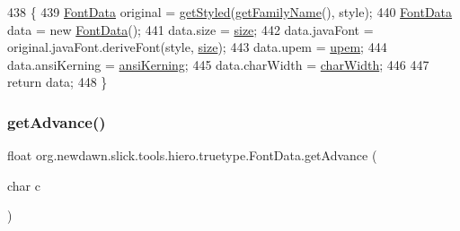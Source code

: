 \begin{DoxyCode}
438                                                       \{
439         \mbox{\hyperlink{classorg_1_1newdawn_1_1slick_1_1tools_1_1hiero_1_1truetype_1_1_font_data_a749bc5408e8c04106d580a31b5c9e597}{FontData}} original = \mbox{\hyperlink{classorg_1_1newdawn_1_1slick_1_1tools_1_1hiero_1_1truetype_1_1_font_data_a06cde06f668d43b61523d65ae1d74055}{getStyled}}(\mbox{\hyperlink{classorg_1_1newdawn_1_1slick_1_1tools_1_1hiero_1_1truetype_1_1_font_data_a4c170863a370f609118f9acbc8d598a7}{getFamilyName}}(), style);
440         \mbox{\hyperlink{classorg_1_1newdawn_1_1slick_1_1tools_1_1hiero_1_1truetype_1_1_font_data_a749bc5408e8c04106d580a31b5c9e597}{FontData}} data = \textcolor{keyword}{new} \mbox{\hyperlink{classorg_1_1newdawn_1_1slick_1_1tools_1_1hiero_1_1truetype_1_1_font_data_a749bc5408e8c04106d580a31b5c9e597}{FontData}}();
441         data.size = \mbox{\hyperlink{classorg_1_1newdawn_1_1slick_1_1tools_1_1hiero_1_1truetype_1_1_font_data_a96af538e2a7368fdba46ffc2ad6a9a0e}{size}};
442         data.javaFont = original.javaFont.deriveFont(style, \mbox{\hyperlink{classorg_1_1newdawn_1_1slick_1_1tools_1_1hiero_1_1truetype_1_1_font_data_a96af538e2a7368fdba46ffc2ad6a9a0e}{size}});
443         data.upem = \mbox{\hyperlink{classorg_1_1newdawn_1_1slick_1_1tools_1_1hiero_1_1truetype_1_1_font_data_ab589aa26cfcd58d7e7f8ffa3c68800a5}{upem}};
444         data.ansiKerning = \mbox{\hyperlink{classorg_1_1newdawn_1_1slick_1_1tools_1_1hiero_1_1truetype_1_1_font_data_ab28272a83e0e9aa3836fbc5f7d913801}{ansiKerning}};
445         data.charWidth = \mbox{\hyperlink{classorg_1_1newdawn_1_1slick_1_1tools_1_1hiero_1_1truetype_1_1_font_data_a2080ecdf80e54bb38848255c70b43706}{charWidth}};
446         
447         \textcolor{keywordflow}{return} data;
448     \}
\end{DoxyCode}
\mbox{\label{classorg_1_1newdawn_1_1slick_1_1tools_1_1hiero_1_1truetype_1_1_font_data_ad2145125927d20f203f0d66f68c366cf}} 
\subsubsection{\texorpdfstring{get\+Advance()}{getAdvance()}}
{\footnotesize\ttfamily float org.\+newdawn.\+slick.\+tools.\+hiero.\+truetype.\+Font\+Data.\+get\+Advance (\begin{DoxyParamCaption}\item[{char}]{c }\end{DoxyParamCaption})\hspace{0.3cm}{\ttfamily [inline]}}

